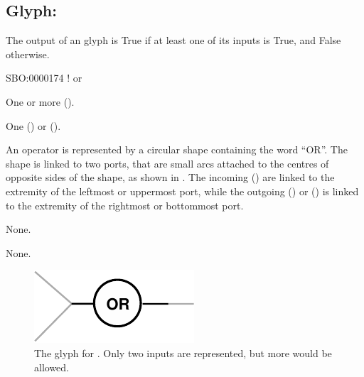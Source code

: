 \subsection{Glyph: }
\label{sec:or}

The output of an  glyph is True if at least one of its inputs is True, and False otherwise.

\begin{glyphDescription}

\glyphSboTerm
SBO:0000174 ! or

\glyphIncoming One or more  ().

\glyphOutgoing
One  () or  ().

\glyphContainer
An  operator is represented by a circular shape containing the word ``OR''.
The shape is linked to two ports, that are small arcs attached to the centres of opposite sides of the shape, as shown in .
The incoming  () are linked to the extremity of the leftmost or uppermost port, while the outgoing  () or  () is linked to the extremity of the rightmost or bottommost port.

\glyphLabel
None.

\glyphAux
None.

\end{glyphDescription}

\begin{figure}[H]
  \centering
  \includegraphics{images/build/or.pdf}
  \caption{The \PD glyph for . Only two inputs are represented, but more would be allowed.}
  \label{fig:or}
\end{figure}

